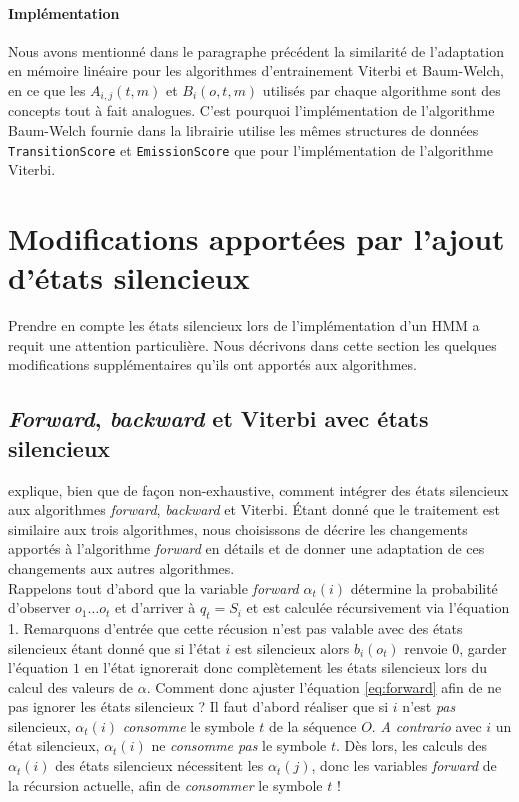 \documentclass[letterpaper]{article}
\begin{document}
\paragraph{Implémentation}
Nous avons mentionné dans le paragraphe précédent la similarité de l'adaptation en mémoire linéaire pour les algorithmes d'entrainement Viterbi et Baum-Welch, en ce que les $A_{i,j}(t,m)$ et $B_i(o, t, m)$ utilisés par chaque algorithme sont des concepts tout à fait analogues. C'est pourquoi l'implémentation de l'algorithme Baum-Welch fournie dans la librairie utilise les mêmes structures de données \texttt{TransitionScore} et \texttt{EmissionScore} que pour l'implémentation de l'algorithme Viterbi. 

\section{Modifications apportées par l'ajout d'états silencieux}
Prendre en compte les états silencieux lors de l'implémentation d'un HMM a requit une attention particulière. Nous décrivons dans cette section les quelques modifications supplémentaires qu'ils ont apportés aux algorithmes.  \\

\subsection{\textit{Forward}, \textit{backward} et Viterbi avec états silencieux}
\cite{Durbin} explique, bien que de façon non-exhaustive, comment intégrer des états silencieux aux algorithmes \textit{forward}, \textit{backward} et Viterbi. Étant donné que le traitement est similaire aux trois algorithmes, nous choisissons de décrire les changements apportés à l'algorithme \textit{forward} en détails et de donner une adaptation de ces changements aux autres algorithmes. \\

Rappelons tout d'abord que la variable \textit{forward} $\alpha_t(i)$ détermine la probabilité d'observer $o_1\dots o_t$ et d'arriver à $q_t =  S_i$ et est calculée récursivement via l'équation 1. Remarquons d'entrée que cette récusion n'est pas valable avec des états silencieux étant donné que si l'état $i$ est silencieux alors $b_i(o_t)$ renvoie $0$, garder l'équation $1$ en l'état ignorerait donc complètement les états silencieux lors du calcul des valeurs de $\alpha$. Comment donc ajuster l'équation \ref{eq:forward} afin de ne pas ignorer les états silencieux ? Il faut d'abord réaliser que si $i$ n'est \textit{pas} silencieux, $\alpha_t(i)$ \textit{consomme} le symbole $t$ de la séquence $O$. \textit{A contrario} avec $i$ un état silencieux, $\alpha_t(i)$ ne \textit{consomme pas} le symbole $t$. Dès lors, les calculs des $\alpha_t(i)$ des états silencieux nécessitent les $\alpha_t(j)$, donc les variables \textit{forward} de la récursion actuelle, afin de \textit{consommer} le symbole $t$ ! \\
\end{document}

